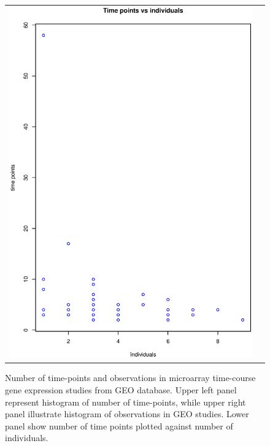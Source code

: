 \documentclass[a4paper]{article}
\begin{document}
\begin{figure}[h!]
\begin{tabular}{cc}
\includegraphics[scale=0.3]{GEOscat.eps}\\
\end{tabular}
\caption{Number of time-points and observations in microarray time-course gene expression studies from GEO database. Upper left panel represent histogram of number of time-points, while upper right panel illustrate histogram of observations in GEO studies. Lower panel show number of time points plotted against number of individuals.}
\label{fig:GEOhist}
\end{figure}
\end{document}
